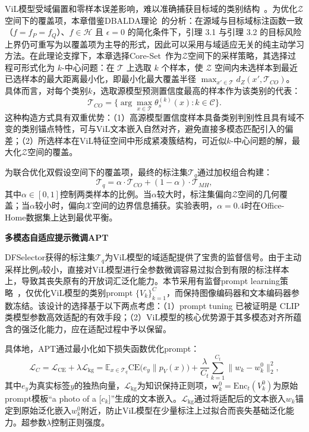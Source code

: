 ViL模型受域偏置和零样本误差影响，难以准确捕获目标域的类别结构~\cite{ge2023domain,tang2024source}。为优化$\mathcal{Z}$空间下的覆盖项，本章借鉴DBALDA理论~\cite{mathelin2022discrepancy}的分析：在源域与目标域标注函数一致（$f=f_P=f_Q$）、$f\in\mathcal{H}$ 且 $\epsilon=0$ 的简化条件下，引理 3.1 与引理 3.2 的目标风险上界仍可重写为以覆盖项为主导的形式，因此可以采用与域适应无关的纯主动学习方法。在此理论支撑下，本章选择Core-Set~\cite{prabhu2021active}作为$\mathcal{Z}$空间下的采样策略，其选择过程可形式化为 $k$-中心问题：在 $\mathcal{T}$ 上选取 $k$ 个样本，使 $\mathcal{Z}$ 空间内未选样本到最近已选样本的最大距离最小化，即最小化最大覆盖半径 $\max_{x'\in\mathcal{T}}d_Z(x',\mathcal{T}_{CO})$。
具体而言，对每个类别$k$，选取源模型预测置信度最高的样本作为该类别的代表：
\begin{equation}
\mathcal{T}_{CO} = \{\arg\max_{x\in\mathcal{T}}\theta_s^{(k)}(x) : k\in\mathcal{C}\}.
\end{equation}
这种构造方式具有双重优势：（1）高源模型置信度样本具备类别判别性且具有域不变的类别锚点特性，可与ViL文本嵌入自然对齐，避免直接多模态匹配引入的偏差；（2）所选样本在ViL特征空间中形成紧凑簇结构，可近似$k$-中心问题的解，最大化$\mathcal{Z}$空间的覆盖。


为联合优化双假设空间下的覆盖项，最终的标注集$\mathcal{T}_q$通过加权组合构建：
\begin{equation}
\mathcal{T}_q = \alpha \cdot \mathcal{T}_{CO} + (1-\alpha)\cdot\mathcal{T}_{MH},
\label{eq:dfselector}
\end{equation}
其中$\alpha\in[0,1]$控制两类样本的比例。当$\alpha$较大时，标注集偏向$\mathcal{Z}$空间的几何覆盖；当$\alpha$较小时，偏向$\mathcal{X}$空间的边界信息捕获。实验表明，$\alpha=0.4$时在Office-Home数据集上达到最优平衡。

\noindent\textbf{多模态自适应提示微调APT}

DFSelector获得的标注集$\mathcal{T}_q$为ViL模型的域适配提供了宝贵的监督信号。由于主动采样比例$\rho$较小，直接对ViL模型进行全参数微调容易过拟合到有限的标注样本上，导致其丧失原有的开放词汇泛化能力。本节采用有监督prompt learning策略~\cite{zhou2022learning}，仅优化ViL模型的类别prompt $\{V_k\}_{k=1}^{C}$，而保持图像编码器和文本编码器参数冻结。该设计的选择基于以下两点考虑：（1）prompt tuning 已被证明是 CLIP 类模型参数高效适配的有效手段；（2）ViL模型的核心优势源于其多模态对齐所蕴含的强泛化能力，应在适配过程中予以保留。

具体地，APT通过最小化如下损失函数优化prompt：
\begin{equation}
\mathcal{L}_C = \mathcal{L}_{\text{CE}} + \lambda \mathcal{L}_{\text{kg}} = \mathbb{E}_{x\in\mathcal{T}_q}\mathrm{CE}\big(e_y \| p_V(x)\big) + \frac{\lambda}{C_t}\sum_{k=1}^{C_t}\|w_k - w_k^0\|_2^2,
\label{eq:apt_loss}
\end{equation}
其中$e_y$为真实标签$y$的独热向量，$\mathcal{L}_{\text{kg}}$为知识保持正则项，$\mathbf{w}_k^0=\mathrm{Enc}_t(V_k^0)$为原始prompt模板“a photo of a [$c_k$]”生成的文本嵌入。$\mathcal{L}_{\text{kg}}$通过将适配后的文本嵌入$w_k$锚定到原始泛化嵌入$w_k^0$附近，防止ViL模型在少量标注上过拟合而丧失基础泛化能力。超参数$\lambda$控制正则强度。

